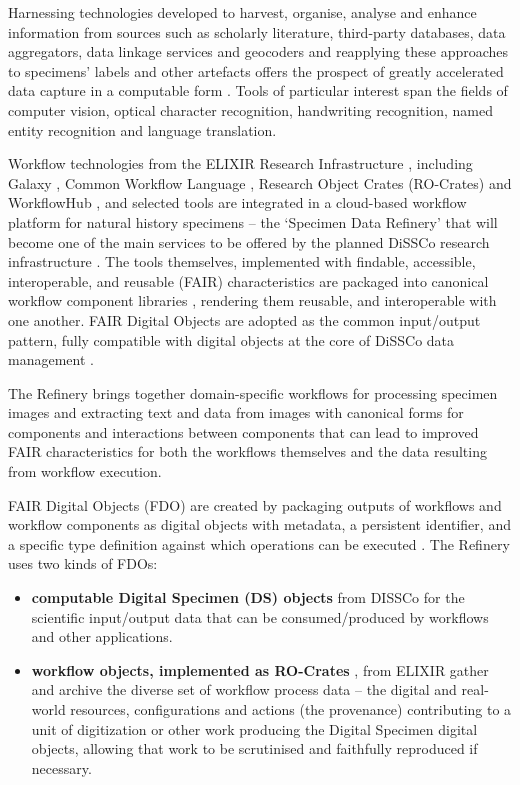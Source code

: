 Harnessing technologies developed to harvest, organise, analyse and
enhance information from sources such as scholarly literature,
third-party databases, data aggregators, data linkage services and
geocoders and reapplying these approaches to specimens' labels and other
artefacts offers the prospect of greatly accelerated data capture in a
computable form \cite{ch8-18}. Tools of particular interest span the fields
of computer vision, optical character recognition, handwriting
recognition, named entity recognition and language translation.

Workflow technologies from the ELIXIR Research Infrastructure \cite{ch8-19},
including Galaxy \cite{Afgan 2018}, Common Workflow Language \cite{Crusoe 2022}, Research
Object Crates (RO-Crates) \cite{OCarragain 2019,ch8-23} and WorkflowHub \cite{Goble 2021}, and
selected tools are integrated in a cloud-based workflow platform for
natural history specimens -- the `Specimen Data Refinery' \cite{Walton 2020} that
will become one of the main services to be offered by the planned DiSSCo
research infrastructure \cite{ch8-5}. The tools themselves, implemented with
findable, accessible, interoperable, and reusable (FAIR) characteristics
\cite{Wilkinson 2016} are packaged into canonical workflow component libraries
\cite{ch8-27}, rendering them reusable, and interoperable with one another.
FAIR Digital Objects are adopted as the common input/output pattern,
fully compatible with digital objects at the core of DiSSCo data
management \cite{ch8-28}.

The Refinery brings together domain-specific workflows for processing
specimen images and extracting text and data from images with canonical
forms for components and interactions between components that can lead
to improved FAIR characteristics for both the workflows themselves and
the data resulting from workflow execution.

FAIR Digital Objects (FDO) are created by packaging outputs of workflows
and workflow components as digital objects with metadata, a persistent
identifier, and a specific type definition against which operations can
be executed \cite{De Smedt 2020}. The Refinery uses two kinds of FDOs:

\begin{itemize}
\item
  \textbf{computable Digital Specimen (DS) objects} \cite{ch8-30} from DISSCo
  for the scientific input/output data that can be consumed/produced by
  workflows and other applications.
\item
  \textbf{workflow objects, implemented as RO-Crates} \cite{ch8-23}, from
  ELIXIR gather and archive the diverse set of workflow process data --
  the digital and real-world resources, configurations and actions (the
  provenance) contributing to a unit of digitization or other work
  producing the Digital Specimen digital objects, allowing that work to
  be scrutinised and faithfully reproduced if necessary.
\end{itemize}

